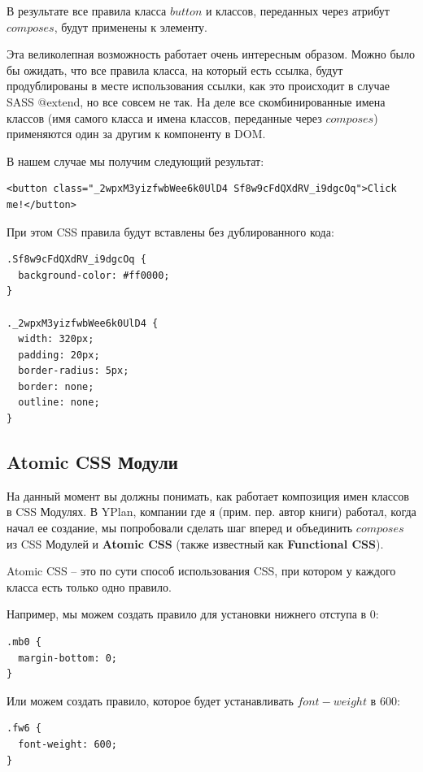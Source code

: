 В результате все правила класса $button$ и классов, переданных через атрибут $composes$, будут применены к элементу.

Эта великолепная возможность работает очень интересным образом. Можно было бы ожидать, что все правила класса, на который есть ссылка, будут продублированы в месте использования ссылки, как это происходит в случае SASS @extend, но все совсем не так. На деле все скомбинированные имена классов (имя самого класса и имена классов, переданные через $composes$) применяются один за другим к компоненту в DOM.

В нашем случае мы получим следующий результат:

\begin{lstlisting}
<button class="_2wpxM3yizfwbWee6k0UlD4 Sf8w9cFdQXdRV_i9dgcOq">Click me!</button>
\end{lstlisting}

При этом CSS правила будут вставлены без дублированного кода:

\begin{lstlisting}
.Sf8w9cFdQXdRV_i9dgcOq {
  background-color: #ff0000;
}

._2wpxM3yizfwbWee6k0UlD4 {
  width: 320px;
  padding: 20px;
  border-radius: 5px;
  border: none;
  outline: none;
}
\end{lstlisting}

\subsection{Atomic CSS Модули}

На данный момент вы должны понимать, как работает композиция имен классов в CSS Модулях. В YPlan, компании где я (прим. пер. автор книги) работал, когда начал ее создание, мы попробовали сделать шаг вперед и объединить $composes$ из CSS Модулей и \textbf{Atomic CSS} (также известный как \textbf{Functional CSS}).

Atomic CSS -- это по сути способ использования CSS, при котором у каждого класса есть только одно правило.

Например, мы можем создать правило для установки нижнего отступа в $0$:

\begin{lstlisting}
.mb0 {
  margin-bottom: 0;
}
\end{lstlisting}

Или можем создать правило, которое будет устанавливать $font-weight$ в $600$:

\begin{lstlisting}
.fw6 {
  font-weight: 600;
}
\end{lstlisting}

